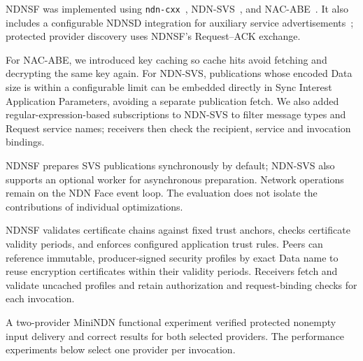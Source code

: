 NDNSF was implemented using \texttt{ndn-cxx}~\cite{ndn-cxx}, NDN-SVS~\cite{ndnsvs-github}, and NAC-ABE~\cite{dulal2023nac-abe}. It also includes a configurable NDNSD integration for auxiliary service advertisements~\cite{dulal2022ndnsd}; protected provider discovery uses NDNSF's Request--ACK exchange.

For NAC-ABE, we introduced key caching so cache hits avoid fetching and decrypting the same key again. For NDN-SVS, publications whose encoded Data size is within a configurable limit can be embedded directly in Sync Interest Application Parameters, avoiding a separate publication fetch. We also added regular-expression-based subscriptions to NDN-SVS to filter message types and Request service names; receivers then check the recipient, service and invocation bindings.

NDNSF prepares SVS publications synchronously by default; NDN-SVS also supports an optional worker for asynchronous preparation. Network operations remain on the NDN Face event loop. The evaluation does not isolate the contributions of individual optimizations.

NDNSF validates certificate chains against fixed trust anchors, checks certificate validity periods, and enforces configured application trust rules. Peers can reference immutable, producer-signed security profiles by exact Data name to reuse encryption certificates within their validity periods. Receivers fetch and validate uncached profiles and retain authorization and request-binding checks for each invocation.

A two-provider MiniNDN functional experiment verified protected nonempty input delivery and correct results for both selected providers. The performance experiments below select one provider per invocation.



